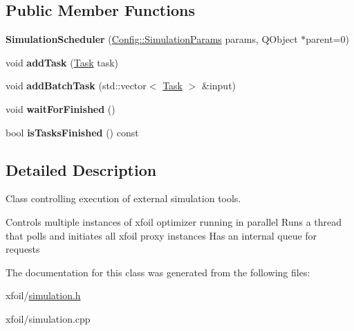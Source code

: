 \subsection*{Public Member Functions}
\begin{DoxyCompactItemize}
\item 
\mbox{\label{class_simulation_scheduler_aa0e08acf06360d47589272e592d031b7}} 
{\bfseries Simulation\+Scheduler} (\hyperlink{struct_config_1_1_simulation_params}{Config\+::\+Simulation\+Params} params, Q\+Object $\ast$parent=0)
\item 
\mbox{\label{class_simulation_scheduler_a5332c3b10da3671ca866fd87fd3cab52}} 
void {\bfseries add\+Task} (\hyperlink{struct_task}{Task} task)
\item 
\mbox{\label{class_simulation_scheduler_ac028f5222d4c99aad4a0adf3dfc3adb7}} 
void {\bfseries add\+Batch\+Task} (std\+::vector$<$ \hyperlink{struct_task}{Task} $>$ \&input)
\item 
\mbox{\label{class_simulation_scheduler_a29ec317ab3b2e81584b264c1894a9ff7}} 
void {\bfseries wait\+For\+Finished} ()
\item 
\mbox{\label{class_simulation_scheduler_a5318e63ab1db5ea45bed3203fb131068}} 
bool {\bfseries is\+Tasks\+Finished} () const
\end{DoxyCompactItemize}


\subsection{Detailed Description}
Class controlling execution of external simulation tools. 

Controls multiple instances of xfoil optimizer running in parallel Runs a thread that polls and initiates all xfoil proxy instances Has an internal queue for requests 

The documentation for this class was generated from the following files\+:\begin{DoxyCompactItemize}
\item 
xfoil/\hyperlink{simulation_8h}{simulation.\+h}\item 
xfoil/simulation.\+cpp\end{DoxyCompactItemize}
